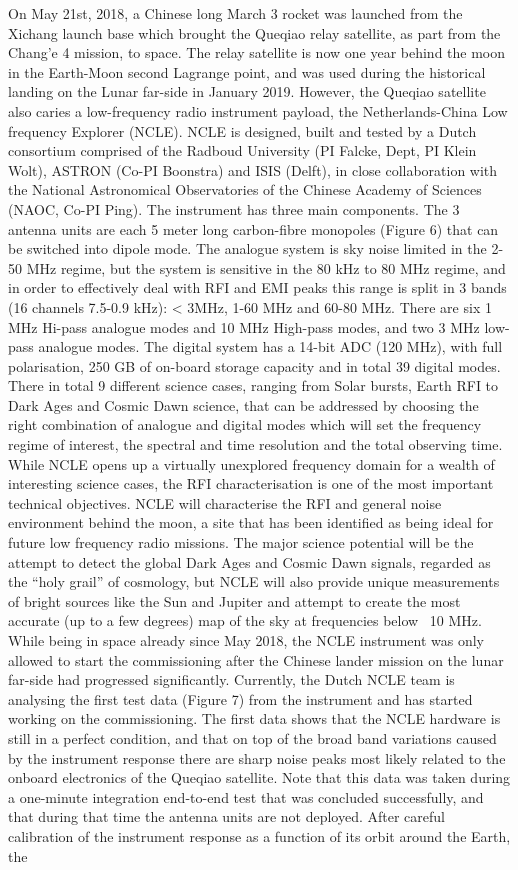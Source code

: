 On May 21st, 2018, a Chinese long March 3 rocket was launched from the Xichang launch base which brought the Queqiao relay satellite, as part from the Chang’e 4 mission, to space. The relay satellite is now one year behind the moon in the Earth-Moon second Lagrange point, and was used during the historical landing on the Lunar far-side in January 2019. However, the Queqiao satellite also caries a low-frequency radio instrument payload, the Netherlands-China Low frequency Explorer (NCLE). NCLE is designed, built and tested by a Dutch consortium comprised of the Radboud University (PI Falcke, Dept, PI Klein Wolt), ASTRON (Co-PI Boonstra) and ISIS (Delft), in close collaboration with the National Astronomical Observatories of the Chinese Academy of Sciences (NAOC, Co-PI Ping). The instrument has three main components. The 3 antenna units are each 5 meter long carbon-fibre monopoles (Figure 6) that can be switched into dipole mode. The analogue system is sky noise limited in the 2-50 MHz regime, but the system is sensitive in the 80 kHz to 80 MHz regime, and in order to effectively deal with RFI and EMI peaks this range is split in 3 bands (16 channels 7.5-0.9 kHz): < 3MHz, 1-60 MHz and 60-80 MHz. There are six 1 MHz Hi-pass analogue modes and 10 MHz High-pass modes, and two 3 MHz low-pass analogue modes. The digital system has a 14-bit ADC (120 MHz), with full polarisation, 250 GB of on-board storage capacity and in total 39 digital modes. There in total 9 different science cases, ranging from Solar bursts, Earth RFI to Dark Ages and Cosmic Dawn science, that can be addressed by choosing the right combination of analogue and digital modes which will set the frequency regime of interest, the spectral and time resolution and the total observing time. While NCLE opens up a virtually unexplored frequency domain for a wealth of interesting science cases, the RFI characterisation is one of the most important technical objectives. NCLE will characterise the RFI and general noise environment behind the moon, a site that has been identified as being ideal for future low frequency radio missions. The major science potential will be the attempt to detect the global Dark Ages and Cosmic Dawn signals, regarded as the “holy grail” of cosmology, but NCLE will also provide unique measurements of bright sources like the Sun and Jupiter and attempt to create the most accurate (up to a few degrees) map of the sky at frequencies below ~10 MHz. While being in space already since May 2018, the NCLE instrument was only allowed to start the commissioning after the Chinese lander mission on the lunar far-side had progressed significantly. Currently, the Dutch NCLE team is analysing the first test data (Figure 7) from the instrument and has started working on the commissioning. The first data shows that the NCLE hardware is still in a perfect condition, and that on top of the broad band variations caused by the instrument response there are sharp noise peaks most likely related to the onboard electronics of the Queqiao satellite. Note that this data was taken during a one-minute integration end-to-end test that was concluded successfully, and that during that time the antenna units are not deployed. After careful calibration of the instrument response as a function of its orbit around the Earth, the 